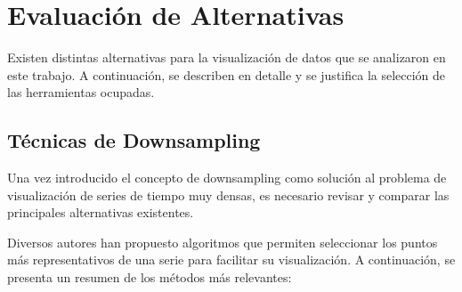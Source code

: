\section{Evaluación de Alternativas}
\label{alternatives}

Existen distintas alternativas para la visualización de datos que se analizaron en este trabajo. A continuación, se describen en detalle y se justifica la selección de las herramientas ocupadas.

\subsection{Técnicas de Downsampling}

Una vez introducido el concepto de downsampling como solución al problema de visualización de series de tiempo muy densas, es necesario revisar y comparar las principales alternativas existentes.

Diversos autores han propuesto algoritmos que permiten seleccionar los puntos más representativos de una serie para facilitar su visualización. A continuación, se presenta un resumen de los métodos más relevantes:

